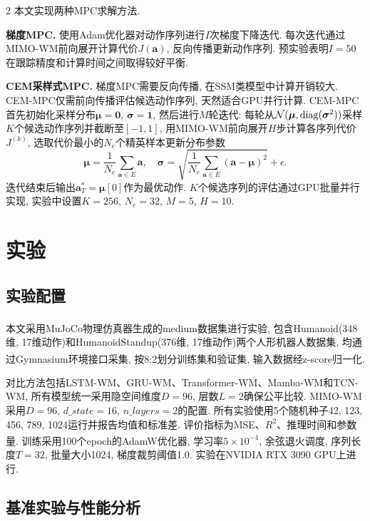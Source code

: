 \begin{multicols}{2}
本文实现两种MPC求解方法.

\textbf{梯度MPC.}
使用Adam优化器对动作序列进行$I$次梯度下降迭代.
每次迭代通过MIMO-WM前向展开计算代价$J({\bm a})$, 反向传播更新动作序列.
预实验表明$I{=}50$在跟踪精度和计算时间之间取得较好平衡.

\textbf{CEM采样式MPC.}
梯度MPC需要反向传播, 在SSM类模型中计算开销较大.
CEM-MPC仅需前向传播评估候选动作序列, 天然适合GPU并行计算.
CEM-MPC首先初始化采样分布${\bm \mu} = {\bm 0}$, ${\bm \sigma} = {\bm 1}$,
然后进行$M$轮迭代: 每轮从$\mathcal{N}({\bm \mu}, {\rm diag}({\bm \sigma}^2))$采样$K$个候选动作序列并截断至$[-1, 1]$, 用MIMO-WM前向展开$H$步计算各序列代价$J^{(k)}$, 选取代价最小的$N_e$个精英样本更新分布参数
\begin{equation}
{\bm \mu} = \frac{1}{N_e}\sum_{{\bm a} \in E} {\bm a}, \quad
{\bm \sigma} = \sqrt{\frac{1}{N_e}\sum_{{\bm a} \in E} ({\bm a} - {\bm \mu})^2} + \epsilon.
\end{equation}
迭代结束后输出${\bm a}_T^* = {\bm \mu}[0]$作为最优动作.
$K$个候选序列的评估通过GPU批量并行实现,
实验中设置$K{=}256$, $N_e{=}32$, $M{=}5$, $H{=}10$.

\section{实验}

\subsection{实验配置}

本文采用MuJoCo\textsuperscript{\cite{28}}物理仿真器生成的medium数据集进行实验, 包含Humanoid(348维, 17维动作)和HumanoidStandup(376维, 17维动作)两个人形机器人数据集, 均通过Gymnasium\textsuperscript{\cite{29}}环境接口采集, 按8:2划分训练集和验证集, 输入数据经z-score归一化.

对比方法包括LSTM-WM、GRU-WM、Transformer-WM、Mamba-WM和TCN-WM, 所有模型统一采用隐空间维度$D{=}96$, 层数$L{=}2$确保公平比较. MIMO-WM采用$D{=}96$, $d\_state{=}16$, $n\_layers{=}2$的配置. 所有实验使用5个随机种子42, 123, 456, 789, 1024运行并报告均值和标准差. 评价指标为MSE、$R^2$、推理时间和参数量. 训练采用100个epoch的AdamW优化器\textsuperscript{\cite{27}}, 学习率$5\times10^{-4}$, 余弦退火调度, 序列长度$T=32$, 批量大小1024, 梯度裁剪阈值1.0. 实验在NVIDIA RTX 3090 GPU上进行.

\subsection{基准实验与性能分析}


\end{multicols}
